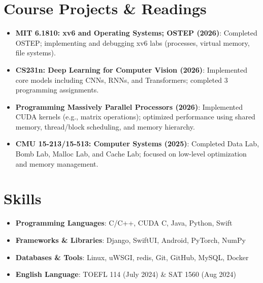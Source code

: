 \documentclass[letterpaper,11pt]{article}
\newcommand{\resumeItem}[2]{
  \item\small{
    \textbf{#1}{: #2 \vspace{-2pt}}
  }
}
\newcommand{\resumeSubItem}[2]{\resumeItem{#1}{#2}\vspace{-4pt}}
\newcommand{\resumeSubHeadingListStart}{\begin{itemize}[leftmargin=*]}
\newcommand{\resumeSubHeadingListEnd}{\end{itemize}}
\begin{document}
\section{Course Projects \& Readings}
  \resumeSubHeadingListStart
    \resumeSubItem{MIT 6.1810: xv6 and Operating Systems; OSTEP (2026)}
      {Completed OSTEP; implementing and debugging xv6 labs (processes, virtual memory, file systems).}
    \resumeSubItem{CS231n: Deep Learning for Computer Vision (2026)}
      {Implemented core models including CNNs, RNNs, and Transformers; completed 3 programming assignments.}
    \resumeSubItem{Programming Massively Parallel Processors (2026)}
    {Implemented CUDA kernels (e.g., matrix operations); optimized performance using shared memory, thread/block scheduling, and memory hierarchy.}
\resumeSubItem{CMU 15-213/15-513: Computer Systems (2025)}
      {Completed Data Lab, Bomb Lab, Malloc Lab, and Cache Lab; focused on low-level optimization and memory management.}
  \resumeSubHeadingListEnd
  
\section{Skills}
 \resumeSubHeadingListStart
    \resumeSubItem{Programming Languages}
      {C/C++, CUDA C, Java, Python, Swift}
    \resumeSubItem{Frameworks \& Libraries}
      {Django, SwiftUI, Android, PyTorch, NumPy}
    \resumeSubItem{Databases \& Tools}
      {Linux, uWSGI, redis, Git, GitHub, MySQL, Docker}
  \resumeSubItem{English Language}
      {TOEFL 114 (July 2024) \& SAT 1560 (Aug 2024)}
 \resumeSubHeadingListEnd


\end{document}

